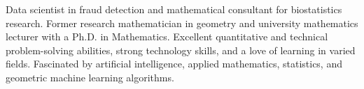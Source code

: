 

\begin{cvparagraph}

Data scientist in fraud detection and mathematical consultant for biostatistics research.
Former research mathematician in geometry and university mathematics lecturer with a Ph.D. in Mathematics.
Excellent quantitative and technical problem-solving abilities, strong technology skills, and a love of learning in varied fields. Fascinated by artificial intelligence, applied mathematics, statistics, and geometric machine learning algorithms.
\end{cvparagraph}
